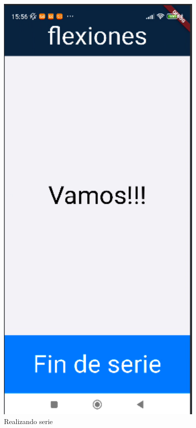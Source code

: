 \begin{figure}[H]
\begin{minipage}{0.4\textwidth}
   \end{minipage}%
   \hspace{0.5cm}
   \begin{minipage}{0.4\textwidth}
      \centering
      \includegraphics[width=0.9\textwidth]{pantallas/entrenando.png}
      \caption{Realizando serie}

\end{minipage}
\end{figure}
